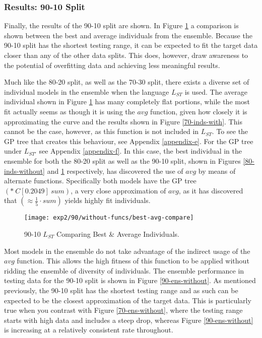 \documentclass[12pt, letterpaper]{article}
\begin{document}
\subsubsection{Results: 90-10 Split}

\textrm{ \indent Finally, the results of the 90-10 split are shown. In Figure \ref{90-inds-without} a comparison is shown between the best and average individuals from the ensemble. Because the 90-10 split has the shortest testing range, it can be expected to fit the target data closer than any of the other data splits. This does, however, draw awareness to the potential of overfitting data and achieving less meaningful results. }

\textrm{ \indent Much like the 80-20 split, as well as the 70-30 split, there exists a diverse set of individual models in the ensemble when the language $L_{ST}$ is used. The average individual shown in Figure \ref{90-inds-without} has many completely flat portions, while the most fit actually seems as though it is using the $avg$ function, given how closely it is approximating the curve and the results shown in Figure \ref{70-inds-with}. This cannot be the case, however, as this function is not included in $L_{ST}$. To see the GP tree that creates this behaviour, see Appendix \ref{appendix-e}. For the GP tree under $L_{ST'}$ see Appendix \ref{appendix-f}. In this case, the best individual in the ensemble for both the 80-20 split as well as the 90-10 split, shown in Figures \ref{80-inds-without} and \ref{90-inds-without} respectively, has discovered the use of $avg$ by means of alternate functions. Specifically both models have the GP tree $(*\ C[0.2049]\ sum)$, a very close approximation of $avg$, as it has discovered that $(\approx \frac{1}{5}\cdot sum)$ yields highly fit individuals. }

\begin{figure}[!htb]
\centering
\texttt{[image: exp2/90/without-funcs/best-avg-compare]}
\caption{ 90-10 $L_{ST}$ Comparing Best \& Average Individuals.}
\label{90-inds-without}
\end{figure}

\textrm{ \indent Most models in the ensemble do not take advantage of the indirect usage of the $avg$ function. This allows the high fitness of this function to be applied without ridding the ensemble of diversity of individuals. The ensemble performance in testing data for the 90-10 split is shown in Figure \ref{90-ens-without}. As mentioned previously, the 90-10 split has the shortest testing range and as such can be expected to be the closest approximation of the target data. This is particularly true when you contrast with Figure \ref{70-ens-without}, where the testing range starts with high data and includes a steep drop, whereas Figure \ref{90-ens-without} is increasing at a relatively consistent rate throughout.}
\end{document}
